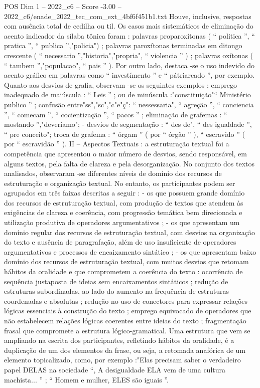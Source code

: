 \begin{textsample}{POS Dim 1 – 2022\_c6 – Score -3.00 – 2022\_c6/enade\_2022\_tec\_com\_ext\_4bf6f451b1.txt}
Houve, inclusive, respostas com ausência total de cedilha ou til.
Os casos mais sistemáticos de eliminação do acento indicador da sílaba tônica foram : palavras proparoxítonas ( “ politica ”, “ pratica ”, “ publica ”,"policia") ; palavras paroxítonas terminadas em ditongo crescente ( “ necessario ”,"historia","propria", “ violencia ” ) ; palavras oxítonas ( “ tambem ”,"populacao", “ pais ” ).
Por outro lado, destaca -se o uso indevido do acento gráfico em palavras como “ investímento ” e “ pátriarcado ”, por exemplo.
Quanto aos desvios de grafia, observam -se os seguintes exemplos : emprego inadequado de maiúscula : “ Leis ” ; ou de minúscula :"constituição"“ Ministério publico ” ; confusão entre"ss","sc","c"e"ç": “ nessessaria", “ agreção ”, “ conciencia ”, “ comecam ”, “ cocientização ”, “ pacos ” ; eliminação de grafemas : “ mostando ”,"deveriamo"; - desvios de segmentação : “ des de", “ des igualdade ”, “ pre conceito"; troca de grafema : “ órgam ” ( por “ órgão ” ), “ escravido ” ( por “ escravidão ” ).
II – Aspectos Textuais : a estruturação textual foi a competência que apresentou o maior número de desvios, sendo responsável, em alguns textos, pela falta de clareza e pela desorganização.
No conjunto dos textos analisados, observaram -se diferentes níveis de domínio dos recursos de estruturação e organização textual.
No entanto, os participantes podem ser agrupados em três faixas descritas a seguir : - os que possuem grande domínio dos recursos de estruturação textual, com produção de textos que atendem às exigências de clareza e coerência, com progressão temática bem direcionada e utilização produtiva de operadores argumentativos ; - os que apresentam um domínio regular dos recursos de estruturação textual, com desvios na organização do texto e ausência de paragrafação, além de uso insuficiente de operadores argumentativos e processos de encaixamento sintático ; - os que apresentam baixo domínio dos recursos de estruturação textual, com muitos desvios que retomam hábitos da oralidade e que comprometem a coerência do texto : ocorrência de sequência justaposta de ideias sem encaixamentos sintáticos ; redução de estruturas subordinadas, ao lado do aumento na frequência de estruturas coordenadas e absolutas ; redução no uso de conectores para expressar relações lógicas essenciais à construção do texto ; emprego equivocado de operadores que não estabelecem relações lógicas coerentes entre ideias do texto ; fragmentação frasal que compromete a estrutura lógico-gramatical.
Uma estrutura que vem se ampliando na escrita dos participantes, refletindo hábitos da oralidade, é a duplicação de um dos elementos da frase, ou seja, a retomada anafórica de um elemento topicalizado, como, por exemplo :"Elas precisam saber o verdadeiro papel DELAS na sociedade “, A desigualdade ELA vem de uma cultura machista... ” ; “ Homem e mulher, ELES são iguais ”.

\end{textsample}
